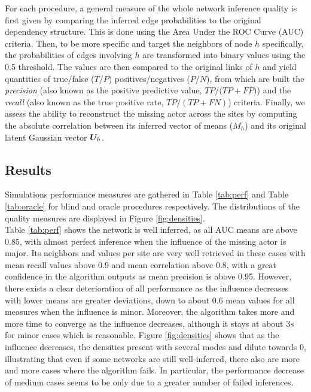 For each procedure, a general measure of the whole network inference quality is first given by comparing the inferred edge probabilities to the original dependency structure. This is done using the Area Under the ROC Curve (AUC) criteria.  Then, to be more specific and target the neighbors of node $h$ specifically, the probabilities of edges involving $h$ are transformed into binary values using the 0.5 threshold. The values are then compared to the original links of $h$ and yield quantities of true/false ($T$/$P$) positives/negatives ($P$/$N$), from which are built the \textit{precision} (also known as the positive predictive value, ${TP}/({TP+FP)}$) and the \textit{recall} (also known as the true positive rate, ${TP}/({TP+FN})$) criteria. Finally, we assess the ability to reconstruct the missing actor across the sites  by computing the absolute correlation between its inferred vector of means ($M_h$) and its original latent Gaussian vector ${\boldsymbol{U}}_h$.


\subsection{Results}
Simulations performance measures are gathered in Table \ref{tab:perf} and Table \ref{tab:oracle} for blind and oracle procedures respectively. The distributions of the quality measures are displayed in Figure \ref{fig:densities}. \\

Table \ref{tab:perf} shows the network is well inferred, as all AUC means are above 0.85, with almost perfect inference when the influence of the missing actor is major. Its neighbors and values per site are very well retrieved in these cases with mean recall values above 0.9 and mean correlation above 0.8, with a great confidence in the algorithm outputs as mean precision is above 0.95. However, there exists a clear deterioration of all performance as the influence decreases with lower means are greater deviations, down to about 0.6 mean values for all measures when the influence is minor. Moreover, the algorithm takes more and more time to converge as the influence decreases, although it stays at about $3s$ for minor cases which is reasonable. Figure \ref{fig:densities} shows that as the influence decreases, the densities present with several modes and dilute towards 0, illustrating that even if some networks are still well-inferred, there also are more and more cases where the algorithm fails. In particular, the performance decrease of medium cases seems to be only due to a greater number of failed inferences.\\

